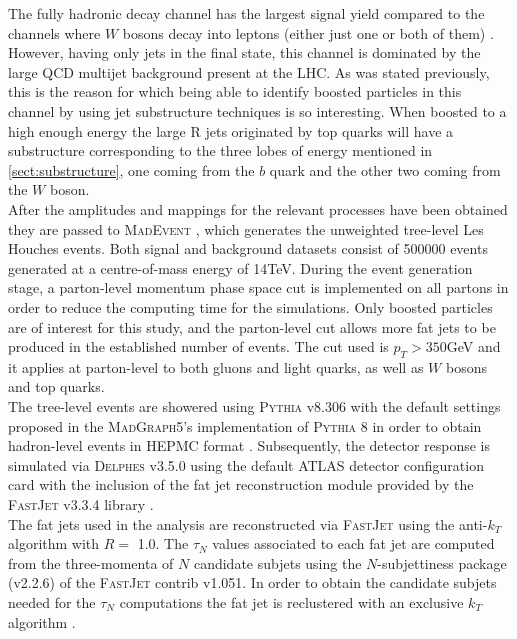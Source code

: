 \documentclass[main]{subfiles} %
\begin{document}
The fully hadronic decay channel has the largest signal yield compared to the channels where $W$ bosons decay into leptons (either just one or both of them) \cite{Silva2013}. However, having only jets in the final state, this channel is dominated by the large QCD multijet background present at the LHC. As was stated previously, this is the reason for which being able to identify boosted particles in this channel by using jet substructure techniques is so interesting. When boosted to a high enough energy the large R jets originated by top quarks will have a substructure corresponding to the three lobes of energy mentioned in \ref{sect:substructure}, one coming from the $b$ quark and the other two coming from the $W$ boson. \\

After the amplitudes and mappings for the relevant processes have been obtained they are passed to \textsc{MadEvent} \cite{Maltoni2003}, which generates the unweighted tree-level Les Houches events. Both signal and background datasets consist of 500000 events generated at a centre-of-mass energy of 14\;TeV. During the event generation stage, a parton-level momentum phase space cut is implemented on all partons in order to reduce the computing time for the simulations. Only boosted particles are of interest for this study, and the parton-level cut allows more fat jets to be produced in the established number of events. The cut used is $p_T > 350$\;GeV and it applies at parton-level to both gluons and light quarks, as well as $W$ bosons and top quarks. \\


The tree-level events are showered using \textsc{Pythia} v8.306 \cite{Sjostrand2015} with the default settings proposed in the \textsc{MadGraph5}'s implementation of \textsc{Pythia 8} in order to obtain hadron-level events in \textsc{HEPMC} format \cite{Dobbs2001}. Subsequently, the detector response is simulated via \textsc{Delphes} v3.5.0 \cite{deFavereau2014} using the default ATLAS detector configuration card with the inclusion of the fat jet reconstruction module provided by the \textsc{FastJet} v3.3.4 library \cite{Cacciari2012}.\\

The fat jets used in the analysis are reconstructed via \textsc{FastJet} using the anti-$k_T$ algorithm with $R =$ 1.0. The $\tau_N$ values associated to each fat jet are computed from the three-momenta of $N$ candidate subjets using the $N$-subjettiness package (v2.2.6) of the \textsc{FastJet} contrib v1.051. In order to obtain the candidate subjets needed for the $\tau_N$ computations the fat jet is reclustered with an exclusive $k_T$ algorithm \cite{Khelifa-Kerfa2022}. \\
\end{document}

